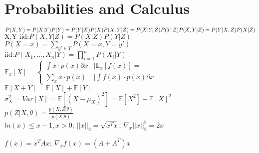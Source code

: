 \section*{Probabilities and Calculus}
$P(X,Y)=P(X|Y)P(Y)=P(Y|X)P(X)\\
P(X,Y|Z)=P(X|Y,Z)P(Y|Z)\\
P(X,Y|Z)=P(Y|X,Z)P(X|Z)$\\
$\text{X,Y iid:}P(X,Y|Z)=P(X|Z)P(Y|Z)$\\
$P(X=x)=\sum_{y'\in Y}P(X=x,Y=y')$\\
$\text{iid:}P(X_1,...,X_n|Y)=\prod_{i=1}^{n}P(X_i|Y)$\\
$\mathbb{E}_x[X] = \begin{cases}
   \int x \cdot p(x) \partial x  &|\mathbb{E}_x[f(x)] =\\
   \sum_x x \cdot p(x) &|\int f(x) \cdot p(x) \partial x
  \end{cases}$\\
$\mathbb{E}[X+Y]=\mathbb{E}[X]+\mathbb{E}[Y]$\\
$\sigma_X^2=Var[X] = \mathbb{E}[(X-\mu_X)^2] = \mathbb{E}[X^2] - \mathbb{E}[X]^2$\\
$p(Z|X,\theta) = \frac{p(X,Z|\theta)}{p(X|\theta)}$\\

$ln(x) \leq x - 1, x>0$; $||x||_2 = \sqrt{x^T x}$; $\nabla_x ||x||_2^2 = 2 x$%

$f(x) = x^T A x$; $\nabla_x f(x) = (A + A^T) x$
